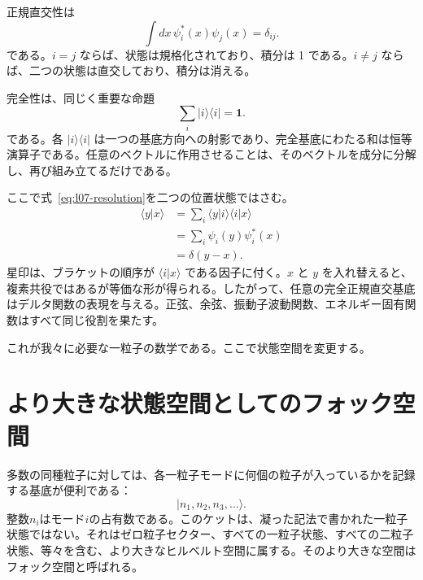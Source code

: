 正規直交性は
\begin{equation}
\int dx\,\psi_i^*(x)\psi_j(x)=\delta_{ij}.
\label{eq:l07-orthonormality}
\end{equation}
である。\(i=j\) ならば、状態は規格化されており、積分は 1 である。\(i\ne j\) ならば、二つの状態は直交しており、積分は消える。

完全性は、同じく重要な命題
\begin{equation}
\sum_i |i\rangle\langle i|=\mathbf 1.
\label{eq:l07-resolution}
\end{equation}
である。各 \(|i\rangle\langle i|\) は一つの基底方向への射影であり、完全基底にわたる和は恒等演算子である。任意のベクトルに作用させることは、そのベクトルを成分に分解し、再び組み立てるだけである。

ここで式~\eqref{eq:l07-resolution}を二つの位置状態ではさむ。
\begin{align}
\langle y|x\rangle
&=\sum_i\langle y|i\rangle\langle i|x\rangle \\
&=\sum_i\psi_i(y)\psi_i^*(x) \\
&=\delta(y-x).
\label{eq:l07-position-completeness}
\end{align}
星印は、ブラケットの順序が \(\langle i|x\rangle\) である因子に付く。\(x\) と \(y\) を入れ替えると、複素共役ではあるが等価な形が得られる。したがって、任意の完全正規直交基底はデルタ関数の表現を与える。正弦、余弦、振動子波動関数、エネルギー固有関数はすべて同じ役割を果たす。

\begin{classroomqa}
\end{classroomqa}

これが我々に必要な一粒子の数学である。ここで状態空間を変更する。

\section{より大きな状態空間としてのフォック空間}

多数の同種粒子に対しては、各一粒子モードに何個の粒子が入っているかを記録する基底が便利である：
\begin{equation}
|n_1,n_2,n_3,\ldots\rangle.
\label{eq:l07-fock-basis}
\end{equation}
整数\(n_i\)はモード\(i\)の占有数である。このケットは、凝った記法で書かれた一粒子状態ではない。それはゼロ粒子セクター、すべての一粒子状態、すべての二粒子状態、等々を含む、より大きなヒルベルト空間に属する。そのより大きな空間はフォック空間と呼ばれる。

